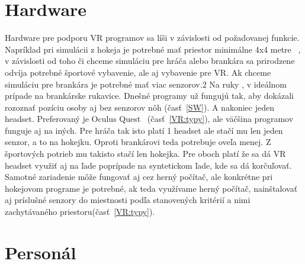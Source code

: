\documentclass[10pt,twoside,slovak,a4paper]{article}										%
\begin{document}
\section{Hardware} \label{HW}
Hardware pre podporu VR programov sa líši v závislosti od požadovanej funkcie. Napríklad pri simulácii z hokeja je potrebné mať priestor minimálne 4x4 metre ~\cite{setuphk:zdroj}, v závislosti od toho či chceme simuláciu pre hráča alebo brankára sa prirodzene odvíja potrebné športové vybavenie, ale aj vybavenie pre VR. Ak chceme simuláciu pre brankára je potrebné mať viac senzorov.2 Na ruky , v ideálnom prípade na brankárske rukavice. Dnešné programy už fungujú tak, aby dokázali rozoznať pozíciu osoby aj bez senzorov nôh (časť~\ref{SW}). A nakoniec jeden headset. Preferovaný je Oculus Quest ~\cite{headset:zdroj}(časť~\ref{VR:typy}), ale väčšina programov funguje aj na iných. Pre hráča tak isto platí 1 headset ale stačí mu len jeden senzor, a to na hokejku. Oproti brankárovi teda potrebuje oveľa menej. Z športových potrieb mu takisto stačí len hokejka. Pre oboch platí že sa dá VR headset využiť aj na ľade poprípade na syntetickom ľade, kde sa dá korčuľovať. Samotné zariadenie môže fungovať aj cez herný počítač, ale konkrétne pri hokejovom programe je potrebné, ak teda využívame herný počítač, nainštalovať aj príslušné senzory do miestnosti podľa stanovených kritérií a nimi zachytávaného priestoru(časť~\ref{VR:typy}).

%

\section{Personál} \label{PR}
\end{document}
